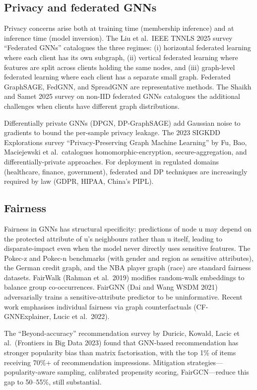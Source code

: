 \subsection{Privacy and federated GNNs}\label{privacy-and-federated-gnns}

Privacy concerns arise both at training time (membership inference) and at inference time (model inversion). The Liu et al.~IEEE TNNLS 2025 survey ``Federated GNNs'' catalogues the three regimes: (i) horizontal federated learning where each client has its own subgraph, (ii) vertical federated learning where features are split across clients holding the same nodes, and (iii) graph-level federated learning where each client has a separate small graph. Federated GraphSAGE, FedGNN, and SpreadGNN are representative methods. The Shaikh and Samet 2025 survey on non-IID federated GNNs catalogues the additional challenges when clients have different graph distributions.

Differentially private GNNs (DPGN, DP-GraphSAGE) add Gaussian noise to gradients to bound the per-sample privacy leakage. The 2023 SIGKDD Explorations survey ``Privacy-Preserving Graph Machine Learning'' by Fu, Bao, Maciejewski et al.~catalogues homomorphic-encryption, secure-aggregation, and differentially-private approaches. For deployment in regulated domains (healthcare, finance, government), federated and DP techniques are increasingly required by law (GDPR, HIPAA, China's PIPL).

\subsection{Fairness}\label{fairness}

Fairness in GNNs has structural specificity: predictions of node u may depend on the protected attribute of u's neighbours rather than u itself, leading to disparate-impact even when the model never directly uses sensitive features. The Pokec-z and Pokec-n benchmarks (with gender and region as sensitive attributes), the German credit graph, and the NBA player graph (race) are standard fairness datasets. FairWalk (Rahman et al.~2019) modifies random-walk embeddings to balance group co-occurrences. FairGNN (Dai and Wang WSDM 2021) adversarially trains a sensitive-attribute predictor to be uninformative. Recent work emphasises individual fairness via graph counterfactuals (CF-GNNExplainer, Lucic et al.~2022).

The ``Beyond-accuracy'' recommendation survey by Duricic, Kowald, Lacic et al.~(Frontiers in Big Data 2023) found that GNN-based recommendation has stronger popularity bias than matrix factorisation, with the top 1\% of items receiving 70\%+ of recommendation impressions. Mitigation strategies---popularity-aware sampling, calibrated propensity scoring, FairGCN---reduce this gap to 50--55\%, still substantial.

